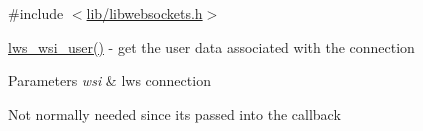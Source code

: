 {\ttfamily \#include $<$\hyperlink{libwebsockets_8h}{lib/libwebsockets.\+h}$>$}

\hyperlink{group__misc_gaa194584fff9698f3b280658f770ccd0f}{lws\+\_\+wsi\+\_\+user()} -\/ get the user data associated with the connection 
\begin{DoxyParams}{Parameters}
{\em wsi} & lws connection\\
\hline
\end{DoxyParams}
Not normally needed since it\textquotesingle{}s passed into the callback 